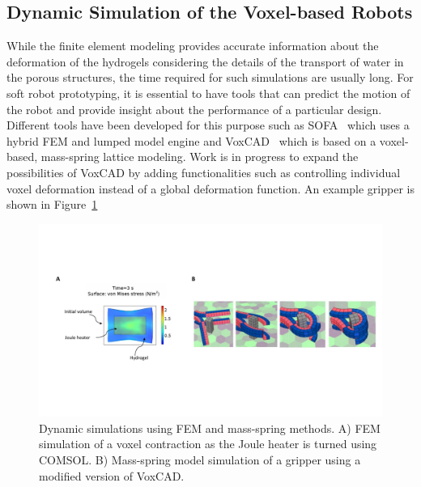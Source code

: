 \subsection{Dynamic Simulation of the Voxel-based Robots}
While the finite element modeling provides accurate information about the deformation of the hydrogels considering the details of the transport of water in the porous structures, the time required for such simulations are usually long. For soft robot prototyping, it is essential to have tools that can predict the motion of the robot and provide insight about the performance of a particular design. Different tools have been developed for this purpose such as SOFA~\cite{Faure2012} which uses a hybrid FEM and lumped model engine and VoxCAD~\cite{Hiller2014} which is based on a voxel-based, mass-spring lattice modeling. Work is in progress to expand the possibilities of VoxCAD by adding functionalities such as controlling individual voxel deformation instead of a global deformation function. An example gripper is shown in Figure~\ref{fig:voxcad}
\begin{figure}[!t]
\centering
\includegraphics[width=\textwidth]{voxcad.pdf}
    \caption[]{Dynamic simulations using FEM and mass-spring methods. A) FEM simulation of a voxel contraction as the Joule heater is turned using COMSOL. B) Mass-spring model simulation of a gripper using a modified version of VoxCAD. }
    \label{fig:voxcad}
\end{figure}


